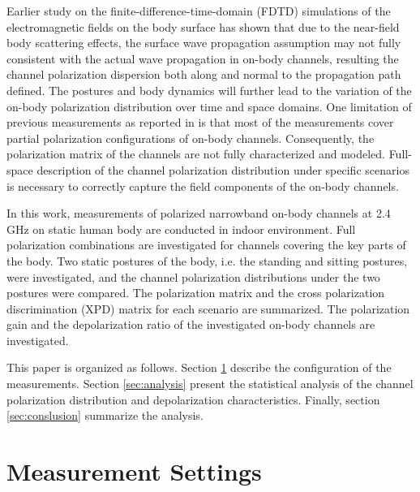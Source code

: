 \documentclass[conference]{IEEEtran}
\begin{document}
Earlier study on the finite-difference-time-domain (FDTD) simulations of the electromagnetic fields on the body surface \cite{manuscriptMap2017} has shown that due to the near-field body scattering effects, the surface wave propagation assumption may not fully consistent with the actual wave propagation in on-body channels, resulting the channel polarization dispersion both along and normal to the propagation path defined. The postures and body dynamics will further lead to the variation of the on-body polarization distribution over time and space domains. One limitation of previous measurements as reported in \cite{6,7,8} is that most of the measurements cover partial polarization configurations of on-body channels. Consequently, the polarization matrix of the channels are not fully characterized and modeled. Full-space description of the channel polarization distribution under specific scenarios is necessary to correctly capture the field components of the on-body channels.

In this work, measurements of polarized narrowband on-body channels at 2.4 GHz on static human body are conducted in indoor environment. Full polarization combinations are investigated for channels covering the key parts of the body. Two static postures of the body, i.e. the standing and sitting postures, were investigated, and the channel polarization distributions under the two postures were compared. The polarization matrix and the cross polarization discrimination (XPD) matrix for each scenario are summarized. The polarization gain and the depolarization ratio of the investigated on-body channels are investigated.

This paper is organized as follows. Section \ref{sec:setup} describe the configuration of the measurements. Section \ref{sec:analysis} present the statistical analysis of the channel polarization distribution and depolarization characteristics. Finally, section \ref{sec:conslusion} summarize the analysis.

\section{Measurement Settings}\label{sec:setup}
\end{document}
